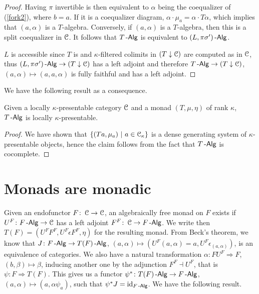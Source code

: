 \documentclass[a4paper,11pt,oneside,openany]{scrbook}
\begin{document}
\begin{proof}
	Having $\pi$ invertible is then equivalent to $\alpha$ being the coequalizer
    of (\ref{fork2}), where $b=a$. If it is a coequalizer diagram,
    $\alpha\cdot\mu_a=\alpha\cdot T\alpha$, which implies that $(a,\alpha)$ is a
    $T$-algebra. Conversely, if $(a,\alpha)$ is a $T$-algebra, then this is a
    split coequalizer in $\operatorname{\mathcal{C}}$. It follows that $T\operatorname{-\mathsf{Alg}}$ is equivalent to
    $(L,\pi\sigma')\operatorname{-\mathsf{Alg}}$.

	$L$ is accessible since $T$ is and $\kappa$-filtered colimits in
    $(T\downarrow\operatorname{\mathcal{C}})$ are computed as in $\operatorname{\mathcal{C}}$, thus
    $(L,\pi\sigma')\operatorname{-\mathsf{Alg}}\rightarrow(T\downarrow\operatorname{\mathcal{C}})$ has a left adjoint and
    therefore $T\operatorname{-\mathsf{Alg}}\rightarrow (T\downarrow\operatorname{\mathcal{C}})$,
    $(a,\alpha)\mapsto(a,a,\alpha)$ is fully faithful and has a left adjoint.
\end{proof}

We have the following result as a consequence.

\begin{thm}
	Given a locally $\kappa$-presentable category $\operatorname{\mathcal{C}}$ and a monad
    $(T,\mu,\eta)$ of rank $\kappa$, $T\operatorname{-\mathsf{Alg}}$ is locally $\kappa$-presentable.
\end{thm}

\begin{proof}
	We have shown that $\{(Ta,\mu_a)\ |\ a\in\operatorname{\mathcal{C}}_\kappa\}$ is a dense generating
    system of $\kappa$-presentable objects, hence the claim follows from the
    fact that $T\operatorname{-\mathsf{Alg}}$ is cocomplete.
\end{proof}

\section{Monads are monadic}

Given an endofunctor $F\colon\operatorname{\mathcal{C}}\rightarrow\operatorname{\mathcal{C}}$, an algebraically free monad on
$F$ exists if $U^F\colon F\operatorname{-\mathsf{Alg}}\rightarrow\operatorname{\mathcal{C}}$ has a left adjoint
$F^F\colon\operatorname{\mathcal{C}}\rightarrow F\operatorname{-\mathsf{Alg}}$. We write then $T(F)=(U^FF^F,U^F\epsilon
F^F,\eta)$ for the resulting monad. From Beck's theorem, we know that $J\colon
F\operatorname{-\mathsf{Alg}}\rightarrow T(F)\operatorname{-\mathsf{Alg}}$, $(a,\alpha)\mapsto
(U^F(a,\alpha)=a,U^F\epsilon_{(a,\alpha)})$, is an equivalence of categories. We
also have a natural transformation $\alpha\colon FU^F\Rightarrow F$,
$(b,\beta)\mapsto\beta$, inducing another one by the adjunction $F^F\dashv U^F$,
that is $\psi\colon F\Rightarrow T(F)$. This gives us a functor
$\psi^*\colon T(F)\operatorname{-\mathsf{Alg}}\rightarrow F\operatorname{-\mathsf{Alg}}$, $(a,\alpha)\mapsto (a,\alpha\psi_a)$,
such that $\psi^* J=\operatorname{id}_{F\operatorname{-\mathsf{Alg}}}$. We have the following result.
\end{document}

